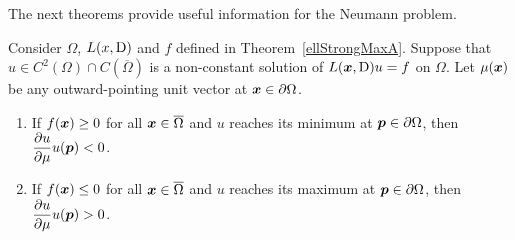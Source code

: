 The next theorems provide useful information for the Neumann problem. 

\begin{theorem} \label{dirDerMaxA}
Consider $\Omega$, $L(x,\operatorname{D})$ and $f$ defined in Theorem~\ref{ellStrongMaxA}.
Suppose that $\displaystyle u \in C^2(\Omega) \cap C(\overline{\Omega})$ is a
non-constant solution of $L({\bm{x}},\operatorname{D}) u = f$ on $\Omega$.
Let $\mu({\bm{x}})$
be any outward-pointing unit vector at ${\bm{x}} \in \partial \Omega$.
\begin{enumerate}
\item If $f({\bm{x}}) \geq 0$ for all ${\bm{x}} \in \overline{\Omega}$
and $u$ reaches its minimum at ${\bm{p}} \in \partial \Omega$,
then $\displaystyle \frac{\partial{u}}{\partial \mu} u({\bm{p}}) < 0$.
\item If $f({\bm{x}}) \leq 0$ for all ${\bm{x}} \in \overline{\Omega}$
and $u$ reaches its maximum at ${\bm{p}} \in \partial \Omega$,
then $\displaystyle \frac{\partial{u}}{\partial \mu} u({\bm{p}}) > 0$.
\end{enumerate}
\end{theorem}

